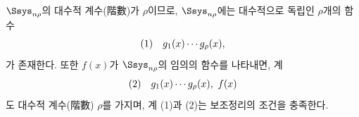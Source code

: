 
$\Ssys_{n\rho}$의 대수적 계수(階數)가 $\rho$이므로, $\Ssys_{n\rho}$에는 대수적으로 독립인 $\rho$개의 함수
\[
\begin{array}{@{}l@{\quad}c@{}}
(1)& g_1(x)\cdots g_\rho(x),
\end{array}
\]
가 존재한다. 또한 $f(x)$가 $\Ssys_{n\rho}$의 임의의 함수를 나타내면, 계
\[
\begin{array}{@{}l@{\quad}c@{}}
(2)& g_1(x)\cdots g_\rho(x),\ f(x)
\end{array}
\]
도 대수적 계수(階數) $\rho$를 가지며, 계 (1)과 (2)는 보조정리의 조건을 충족한다.
